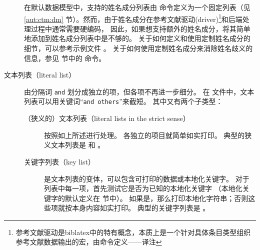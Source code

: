 \begin{description}

在默认数据模型中，支持的姓名成分列表由  命令定义为一个固定列表（见 \ref{aut:ctm:dm} 节）。然而，由于姓名成分在参考文献驱动(driver)\footnote{参考文献驱动是biblatex中的特有概念，本质上是一个针对具体条目类型组织参考文献数据输出的宏，由命令定义——译注}和后端处理过程中通常需要硬编码，
因此，如果想支持额外的姓名成分，将其简单地添加到姓名成分列表中是不够的。
关于如何定义和使用定制姓名成分的细节，可以参考示例文件 。
关于如何使用定制姓名成分来消除姓名歧义的信息，参见  节中的  命令。

\item[文本列表（literal list）] 由分隔词 \texttt{and} 划分成独立的项，但各项不再进一步细分。
在  文件中，文本列表可以用关键词“\texttt{and others}”来截短。
其中又有两个子类型：

\begin{description}

\item[（狭义的）文本列表（literal lists in the strict sense）] 按照如上所述进行处理。
各独立的项目就简单如实打印。
典型的狭义文本列表是  和 。

\item[关键字列表（key list）]  是文本列表的变体，可以包含可打印的数据或本地化关键字。
对于列表中每一项，首先测试它是否为已知的本地化关键字
（本地化关键字的默认定义在  节中）。
如果是，那么打印本地化字符串；否则这些项就按本身内容如实打印。
典型的关键字列表是 。


\end{description}
\end{description}

